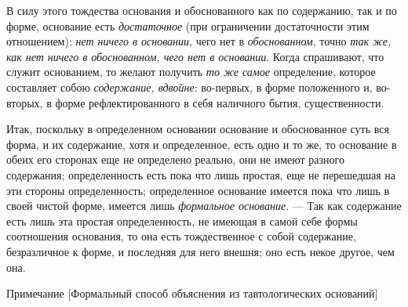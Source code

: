 В силу этого тождества основания и обоснованного как по содержанию, так и по
форме, основание есть {\em достаточное} (при
ограничении достаточности этим отношением); {\em нет
ничего в основании}, чего нет в {\em обоснованном},
точно {\em так же, как нет ничего в обоснованном, чего
нет в основании}. Когда спрашивают, что служит основанием, то желают
получить {\em то же самое} определение, которое
составляет собою {\em содержание, вдвойне}: во-первых,
в форме положенного и, во-вторых, в форме рефлектированного в себя
наличного бытия, существенности.

Итак, поскольку в определенном основании основание и обоснованное суть вся
форма, и их содержание, хотя и определенное, есть одно и то же, то
основание в обеих его сторонах еще не определено реально, они не имеют
разного содержания; определенность есть пока что лишь простая, еще не
перешедшая на эти стороны определенность; определенное основание имеется
пока что лишь в своей чистой форме, имеется лишь
{\em формальное основание}. — Так как содержание есть
лишь эта простая определенность, не имеющая в самой себе формы соотношения
основания, то она есть тождественное с собой содержание, безразличное к
форме, и последняя для него внешня; оно есть некое другое, чем она.

{\centering
Примечание
[Формальный способ объяснения из тавтологических оснований]
\par}

